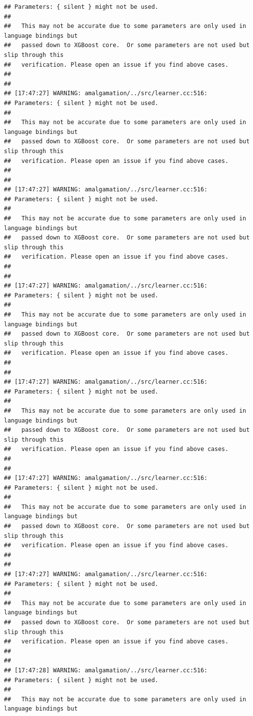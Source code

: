 \documentclass[AMS,STIX2COL]{WileyNJD-v2}\usepackage[]{graphicx}\usepackage[]{color}
\makeatletter
\newenvironment{kframe}{%
 \def\at@end@of@kframe{}%
 \ifinner\ifhmode%
  \def\at@end@of@kframe{\end{minipage}}%
  \begin{minipage}{\columnwidth}%
 \fi\fi%
 \def\FrameCommand##1{\hskip\@totalleftmargin \hskip-\fboxsep
 \colorbox{shadecolor}{##1}\hskip-\fboxsep
     \hskip-\linewidth \hskip-\@totalleftmargin \hskip\columnwidth}%
 \MakeFramed {\advance\hsize-\width
   \@totalleftmargin\z@ \linewidth\hsize
   \@setminipage}}%
 {\par\unskip\endMakeFramed%
 \at@end@of@kframe}
\newenvironment{knitrout}{}{} %
\makeatother
\begin{document}
\begin{knitrout}
\begin{kframe}
\begin{verbatim}
## Parameters: { silent } might not be used.
## 
##   This may not be accurate due to some parameters are only used in language bindings but
##   passed down to XGBoost core.  Or some parameters are not used but slip through this
##   verification. Please open an issue if you find above cases.
## 
## 
## [17:47:27] WARNING: amalgamation/../src/learner.cc:516: 
## Parameters: { silent } might not be used.
## 
##   This may not be accurate due to some parameters are only used in language bindings but
##   passed down to XGBoost core.  Or some parameters are not used but slip through this
##   verification. Please open an issue if you find above cases.
## 
## 
## [17:47:27] WARNING: amalgamation/../src/learner.cc:516: 
## Parameters: { silent } might not be used.
## 
##   This may not be accurate due to some parameters are only used in language bindings but
##   passed down to XGBoost core.  Or some parameters are not used but slip through this
##   verification. Please open an issue if you find above cases.
## 
## 
## [17:47:27] WARNING: amalgamation/../src/learner.cc:516: 
## Parameters: { silent } might not be used.
## 
##   This may not be accurate due to some parameters are only used in language bindings but
##   passed down to XGBoost core.  Or some parameters are not used but slip through this
##   verification. Please open an issue if you find above cases.
## 
## 
## [17:47:27] WARNING: amalgamation/../src/learner.cc:516: 
## Parameters: { silent } might not be used.
## 
##   This may not be accurate due to some parameters are only used in language bindings but
##   passed down to XGBoost core.  Or some parameters are not used but slip through this
##   verification. Please open an issue if you find above cases.
## 
## 
## [17:47:27] WARNING: amalgamation/../src/learner.cc:516: 
## Parameters: { silent } might not be used.
## 
##   This may not be accurate due to some parameters are only used in language bindings but
##   passed down to XGBoost core.  Or some parameters are not used but slip through this
##   verification. Please open an issue if you find above cases.
## 
## 
## [17:47:27] WARNING: amalgamation/../src/learner.cc:516: 
## Parameters: { silent } might not be used.
## 
##   This may not be accurate due to some parameters are only used in language bindings but
##   passed down to XGBoost core.  Or some parameters are not used but slip through this
##   verification. Please open an issue if you find above cases.
## 
## 
## [17:47:28] WARNING: amalgamation/../src/learner.cc:516: 
## Parameters: { silent } might not be used.
## 
##   This may not be accurate due to some parameters are only used in language bindings but

\end{verbatim}
\end{kframe}
\end{knitrout}
\end{document}
